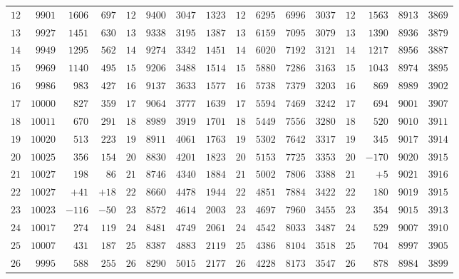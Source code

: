 \begin{center}
\begin{tabular}{r|r|r|r||r|r|r|r||r|r|r|r||r|r|r|r}
$12$ & $9901$ & $1606$ & $697$ & $12$ & $9400$ & $3047$ & $1323$ & $12$ & $6295$ & $6996$ & $3037$ & $12$ & $1563$ & $8913$ & $3869$\\
$13$ & $9927$ & $1451$ & $630$ & $13$ & $9338$ & $3195$ & $1387$ & $13$ & $6159$ & $7095$ & $3079$ & $13$ & $1390$ & $8936$ & $3879$\\
$14$ & $9949$ & $1295$ & $562$ & $14$ & $9274$ & $3342$ & $1451$ & $14$ & $6020$ & $7192$ & $3121$ & $14$ & $1217$ & $8956$ & $3887$\\
$15$ & $9969$ & $1140$ & $495$ & $15$ & $9206$ & $3488$ & $1514$ & $15$ & $5880$ & $7286$ & $3163$ & $15$ & $1043$ & $8974$ & $3895$\\[3pt]
$16$ & $9986$ & $983$ & $427$ & $16$ & $9137$ & $3633$ & $1577$ & $16$ & $5738$ & $7379$ & $3203$ & $16$ & $869$ & $8989$ & $3902$\\
$17$ & $10000$ & $827$ & $359$ & $17$ & $9064$ & $3777$ & $1639$ & $17$ & $5594$ & $7469$ & $3242$ & $17$ & $694$ & $9001$ & $3907$\\
$18$ & $10011$ & $670$ & $291$ & $18$ & $8989$ & $3919$ & $1701$ & $18$ & $5449$ & $7556$ & $3280$ & $18$ & $520$ & $9010$ & $3911$\\
$19$ & $10020$ & $513$ & $223$ & $19$ & $8911$ & $4061$ & $1763$ & $19$ & $5302$ & $7642$ & $3317$ & $19$ & $345$ & $9017$ & $3914$\\
$20$ & $10025$ & $356$ & $154$ & $20$ & $8830$ & $4201$ & $1823$ & $20$ & $5153$ & $7725$ & $3353$ & $20$ & $-170$ & $9020$ & $3915$\\[3pt]
$21$ & $10027$ & $198$ & $86$ & $21$ & $8746$ & $4340$ & $1884$ & $21$ & $5002$ & $7806$ & $3388$ & $21$ & $+5$ & $9021$ & $3916$\\
$22$ & $10027$ & $+41$ & $+18$ & $22$ & $8660$ & $4478$ & $1944$ & $22$ & $4851$ & $7884$ & $3422$ & $22$ & $180$ & $9019$ & $3915$\\
$23$ & $10023$ & $-116$ & $-50$ & $23$ & $8572$ & $4614$ & $2003$ & $23$ & $4697$ & $7960$ & $3455$ & $23$ & $354$ & $9015$ & $3913$\\
$24$ & $10017$ & $274$ & $119$ & $24$ & $8481$ & $4749$ & $2061$ & $24$ & $4542$ & $8033$ & $3487$ & $24$ & $529$ & $9007$ & $3910$\\
$25$ & $10007$ & $431$ & $187$ & $25$ & $8387$ & $4883$ & $2119$ & $25$ & $4386$ & $8104$ & $3518$ & $25$ & $704$ & $8997$ & $3905$\\[3pt]
$26$ & $9995$ & $588$ & $255$ & $26$ & $8290$ & $5015$ & $2177$ & $26$ & $4228$ & $8173$ & $3547$ & $26$ & $878$ & $8984$ & $3899$\\

\end{tabular}
\end{center}
